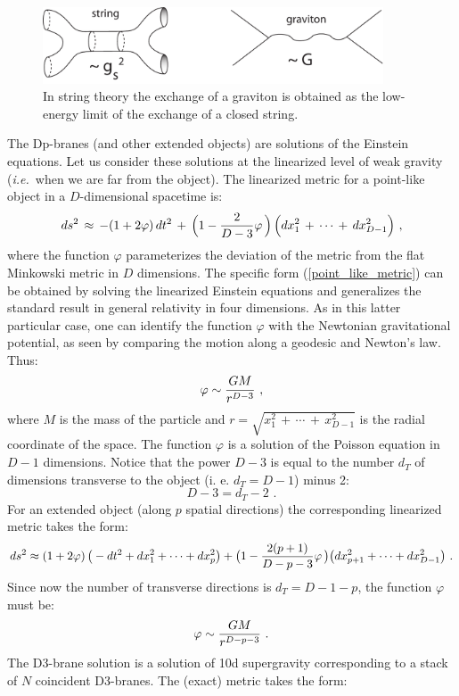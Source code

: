 \documentclass[12pt,notitlepage]{article}
\newcommand{\beq}{\begin{equation}}
\newcommand{\eeq}{\end{equation}}
\def\ie{{\emph{i.e.}}}
\begin{document}
\begin{figure}[ht]
\center
\includegraphics[width=0.9\textwidth]{graviton.pdf}
\caption{In string theory the exchange of a graviton is obtained as the low-energy limit of the exchange of a closed string. } 
\label{Newton_string.pdf}
\end{figure}



The Dp-branes (and other extended objects) are solutions of the Einstein equations. Let us consider these solutions at the linearized level of weak gravity (\ie\ when we are far from the object). The linearized metric for a point-like object in a $D$-dimensional  spacetime is:
\beq
ds^2\,\approx\,-(1+2\varphi)\,dt^2\,+\,\Big(1-{2\over D-3}\varphi\,\Big)\,
\Big(dx_1^2\,+\,\cdots\,+\, dx_{D-1}^2\Big)\,\,,
\label{point_like_metric}
\eeq
where the function  $\varphi$ parameterizes the deviation of the metric from the flat Minkowski metric in $D$ dimensions. The specific form (\ref{point_like_metric}) can be obtained by solving the linearized Einstein equations and generalizes the standard result in general relativity  in four dimensions. As in this latter particular case, one can identify the function $\varphi$ with
the Newtonian gravitational potential, as seen by comparing the motion along a geodesic and Newton's law. Thus:
\beq
\varphi\sim {GM\over r^{D-3}}\,\,,
\eeq
where $M$ is  the mass of the particle and  $r=\sqrt{x_1^2\,+\,\cdots\,+\, x_{D-1}^2}$  is the radial coordinate of the space. The function  $\varphi$ is a solution of the Poisson equation in $D-1$ dimensions. Notice that the power $D-3$ is equal to the number $d_T$ of dimensions transverse to the object (i. e.   $d_T=D-1$) minus 2:
\beq
D-3=d_T-2\,\,.
\eeq
For an extended object (along $p$ spatial directions)  the corresponding linearized metric takes the form:
\beq
ds^2\approx(1+2\varphi)\,\big(-dt^2+dx_1^2+\cdots+ dx_{p}^2\big)+
\big(1-{2(p+1)\over D-p-3}\varphi\,\big)
\big(dx_{p+1}^2+\cdots+ dx_{D-1}^2\big)\,\,.
\label{extended_metric}
\eeq
Since now the number of transverse directions is $d_T=D-1-p$, the function  $\varphi$ must be:
\beq
\varphi\sim {GM\over r^{D-p-3}}\,\,.
\label{extended_potential}
\eeq
The  D3-brane solution is a solution of 10d supergravity corresponding to a stack of $N$ coincident D3-branes. The (exact) metric takes the form:
\end{document}
